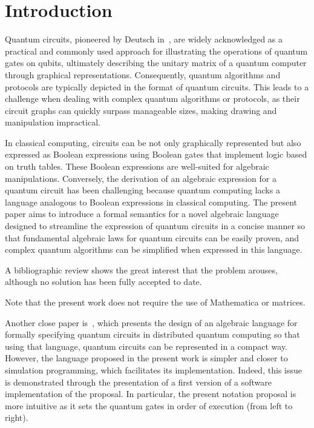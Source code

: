 \section{Introduction}

Quantum circuits, pioneered by Deutsch in~\cite{Deutsch1989}, are widely acknowledged as a practical and commonly used approach for illustrating the operations of quantum gates on qubits, ultimately describing the unitary matrix of a quantum computer through graphical representations.
Consequently, quantum algorithms and protocols are typically depicted in the format of quantum circuits.
This leads to a challenge when dealing with complex quantum algorithms or protocols, as their circuit graphs can quickly surpass manageable sizes, making drawing and manipulation impractical.

In classical computing, circuits can be not only graphically represented but also expressed as Boolean expressions using Boolean gates that implement logic based on truth tables.
These Boolean expressions are well-suited for algebraic manipulations.
Conversely, the derivation of an algebraic expression for a quantum circuit has been challenging because quantum computing lacks a language analogous to Boolean expressions in classical computing.
The present paper aims to introduce a formal semantics for a novel algebraic language designed to streamline the expression of quantum circuits in a concise manner so that fundamental algebraic laws for quantum circuits can be easily proven, and complex quantum algorithms can be simplified when expressed in this language.

A bibliographic review shows the great interest that the problem arouses, although no solution has been fully accepted to date.

Note that the present work does not require the use of Mathematica or matrices.

Another close paper is~\cite{Ying}, which presents the design of an algebraic language for formally specifying quantum circuits in distributed quantum computing so that using that language, quantum circuits can be represented in a compact way.
However, the language proposed in the present work is simpler and closer to simulation programming, which facilitates its implementation.
Indeed, this issue is demonstrated through the presentation of a first version of a software implementation of the proposal.
In particular, the present notation proposal is more intuitive as it sets the quantum gates in order of execution (from left to right).

